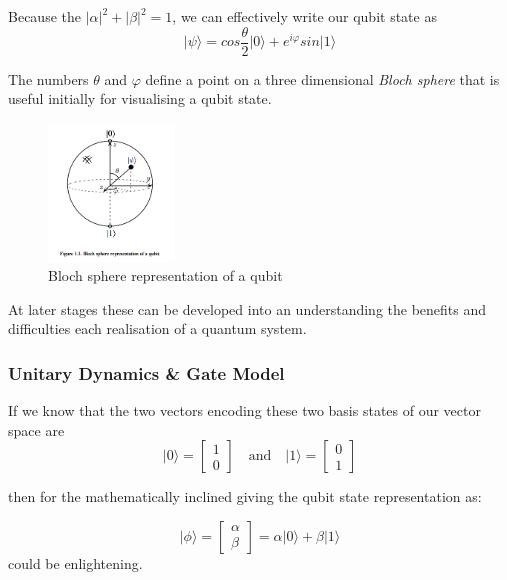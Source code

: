 Because the $\lvert\alpha\lvert^2 + \lvert\beta\lvert^2 = 1$, we can effectively write our qubit state as \cite{Nielsen:2010}
$$\lvert\psi\rangle = cos \frac{\theta}{2} \lvert0\rangle + e^{i\varphi} sin \lvert1\rangle $$

The numbers $\theta$ and $\varphi$ define a point on a three dimensional \emph{Bloch sphere} 
that is useful initially for visualising a qubit state.

\begin{figure}[ht] 
	\begin{adjustbox}{center}
		\includegraphics[width=0.3\textwidth, inner]{figures/blochsphere-nielsen-and-chuang-toc-and-chapter1-nov00.png}
	\end{adjustbox}
	\caption{Bloch sphere representation of a qubit }
	\label{fig:bloch_sphere}
\end{figure}

At later stages these can be developed into an understanding the benefits and difficulties each 
realisation of a quantum system.

\subsubsection{Unitary Dynamics \& Gate Model}

If we know that the two vectors encoding these two basis states of our vector space are
$$\lvert0\rangle = \begin{bmatrix} 1 \\ 0 \end{bmatrix} \quad \textrm{and} \quad \lvert1\rangle = \begin{bmatrix} 0 \\ 1 \end{bmatrix}$$

then for the mathematically inclined giving the qubit state representation as:

$$\lvert\phi\rangle = \begin{bmatrix} \alpha \\ \beta \end{bmatrix} = \alpha\lvert0\rangle + \beta\lvert1\rangle$$
could be enlightening.

